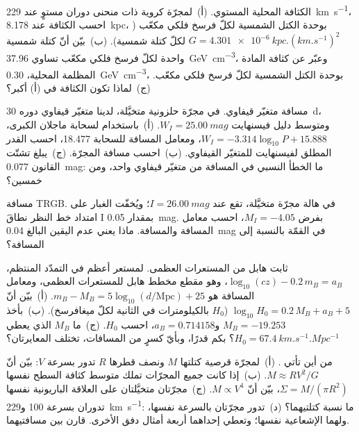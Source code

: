 \begin{exercise}[$\star\star$]\label{exo:b3:milky-way-galaxies:6}
الكثافة المحلية  المستوي. (أ)~لمجرّة كروية
ذات منحنى دوران مستوٍ عند \qty{229}{km.s^{-1}}، احسب الكثافة عند
\qty{8.178}{kpc}، بوحدة الكتل الشمسية لكلّ فرسخ فلكي مكعّب
($G = \qty{4.301e-6}{kpc.(km.s^{-1})^2}$ لكلّ كتلة شمسية). (ب)~بيّن أنّ
كتلة شمسية واحدة لكلّ فرسخ فلكي مكعّب تساوي \qty{37.96}{GeV.cm^{-3}}، وعبّر
عن كثافة المادة المظلمة المحلية، \qty{0.30}{GeV.cm^{-3}}، بوحدة الكتل الشمسية
لكلّ فرسخ فلكي مكعّب. (ج)~لماذا تكون الكثافة في (أ) أكبر؟
\end{exercise}

\begin{exercise}[$\star\star$]\label{exo:b3:milky-way-galaxies:7}
مسافة متغيّر قيفاوي. في مجرّة حلزونية متخيَّلة، لدينا متغيّر قيفاوي دوره
\qty{30}{d}، ومتوسط دليل فيسنهايت $W_I = \qty{25.00}{mag}$.
(أ)~باستخدام  لسحابة ماجلان الكبرى،
$W_I = -3.314\log_{10}P + 15.888$، ومعامل المسافة للسحابة
18.477، احسب القدر المطلق لفيسنهايت للمتغيّر القيفاوي. (ب)~احسب
مسافة المجرّة. (ج)~يبلغ تشتّت القانون \qty{0.077}{mag}: ما
الخطأ النسبي في المسافة من متغيّر قيفاوي واحد، ومن خمسين؟
\end{exercise}

\begin{exercise}[$\star\star$]\label{exo:b3:milky-way-galaxies:8}
مسافة TRGB. في هالة مجرّة متخيَّلة، تقع  عند $I = \qty{26.00}{mag}$؛ ويُخفّت الغبار على امتداد خط
النظر نطاقَ I بمقدار \qty{0.05}{mag}. بفرض $M_I = -4.05$، احسب
معامل المسافة والمسافة. ماذا يعني عدم اليقين البالغ
\qty{0.04}{mag} في القمّة بالنسبة إلى المسافة؟
\end{exercise}

\begin{exercise}[$\star\star$]\label{exo:b3:milky-way-galaxies:9}
ثابت هابل من المستعرات العظمى. لمستعر أعظم في
التمدّد المنتظم، $\log_{10}(cz) - 0.2\,m_B = a_B$، وهو مقطع
مخطط هابل للمستعرات العظمى، ومعامل المسافة هو
$m_B - M_B = 5\log_{10}(d/\mathrm{Mpc}) + 25$. (أ)~بيّن أنّ
$\log_{10}H_0 = 0.2\,M_B + a_B + 5$ ($H_0$ بالكيلومترات في الثانية لكلّ
ميغافرسخ). (ب)~بأخذ $M_B = -19.253$ و$a_B = 0.714158$، احسب $H_0$.
(ج)~ما $M_B$ الذي يعطي $H_0 = \qty{67.4}{km.s^{-1}.Mpc^{-1}}$؟ بكم
قدرًا، وبأيّ كسرٍ من المسافات، تختلف
المعايرتان؟
\end{exercise}

\begin{exercise}[$\star\star\star$]\label{exo:b3:milky-way-galaxies:10}
من أين تأتي . (أ)~لمجرّة قرصية كتلتها $M$
ونصف قطرها $R$ تدور بسرعة $V$: بيّن أنّ $M \approx RV^2/G$. (ب)~إذا كانت جميع
المجرّات  تملك متوسط كثافة السطح نفسها $\Sigma = M/(\pi R^2)$،
بيّن أنّ $M \propto V^4$. (ج)~مجرّتان متخيَّلتان على العلاقة الباريونية نفسها
تدوران بسرعة 100 و\qty{229}{km.s^{-1}}: ما نسبة
كتلتيهما؟ (د)~تدور مجرّتان بالسرعة نفسها، ولهما
الإشعاعية نفسها؛ وتعطي إحداهما أربعة أمثال دفق الأخرى. قارن
بين مسافتيهما.
\end{exercise}

